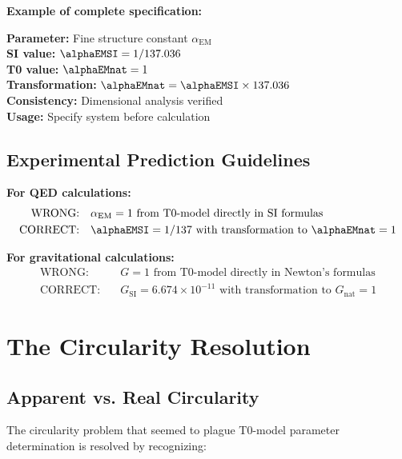 	\textbf{Example of complete specification:}
	\begin{tcolorbox}[colback=red!5!white,colframe=red!75!black,title=Parameter Specification Template]
		\textbf{Parameter:} Fine structure constant $\alpha_{\text{EM}}$ \\
		\textbf{SI value:} $\alphaEMSI = 1/137.036$ \\
		\textbf{T0 value:} $\alphaEMnat = 1$ \\
		\textbf{Transformation:} $\alphaEMnat = \alphaEMSI \times 137.036$ \\
		\textbf{Consistency:} Dimensional analysis verified \\
		\textbf{Usage:} Specify system before calculation
	\end{tcolorbox}
	
	\subsection{Experimental Prediction Guidelines}
	\label{subsec:experimental_guidelines}
	
	\textbf{For QED calculations:}
	\begin{align}
		\text{WRONG:} \quad &\alpha_{\text{EM}} = 1 \text{ from T0-model directly in SI formulas} \\
		\text{CORRECT:} \quad &\alphaEMSI = 1/137 \text{ with transformation to } \alphaEMnat = 1
	\end{align}
	
	\textbf{For gravitational calculations:}
	\begin{align}
		\text{WRONG:} \quad &G = 1 \text{ from T0-model directly in Newton's formulas} \\
		\text{CORRECT:} \quad &G_{\text{SI}} = 6.674 \times 10^{-11} \text{ with transformation to } G_{\text{nat}} = 1
	\end{align}
	
	\section{The Circularity Resolution}
	\label{sec:circularity_resolution}
	
	\subsection{Apparent vs. Real Circularity}
	\label{subsec:apparent_real_circularity}
	
	The circularity problem that seemed to plague T0-model parameter determination is resolved by recognizing:
	
